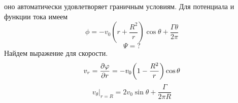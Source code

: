 оно автоматически удовлетворяет граничным условиям. Для
потенциала и функции тока имеем
$$\phi = -v_0 \left( r+\frac{R^2}{r}\right)\cos\theta + \frac{\Gamma \theta}{2\pi}$$
$$\Psi=?$$
Найдем выражение для скорости.
\begin{equation}
	v_r=\pdv{\varphi}{r}=-v_0\qty(1-\frac{R^2}{r})\cos\theta
\end{equation}
\begin{equation}
	v_\theta\bigg|_{r=R}=2v_0\sin\theta+\frac{\Gamma}{2\pi R}
\end{equation}



